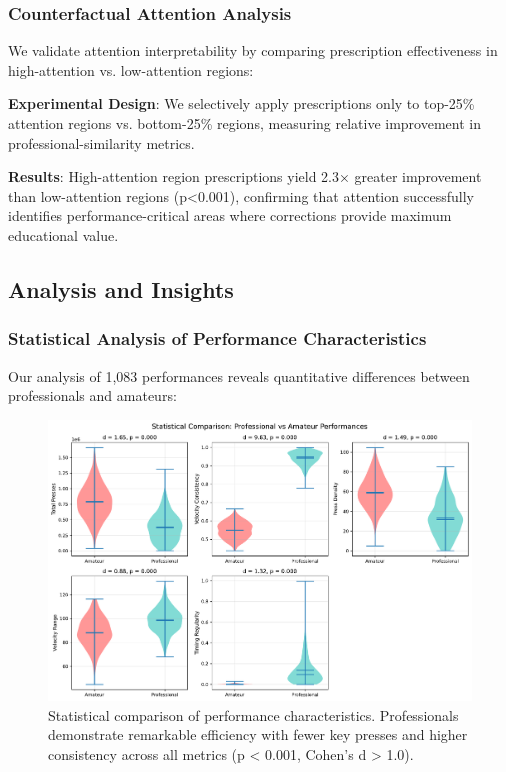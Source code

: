 \documentclass[sigconf,review,anonymous]{acmart}
\begin{document}
\subsubsection{Counterfactual Attention Analysis}
We validate attention interpretability by comparing prescription effectiveness in high-attention vs. low-attention regions:

\textbf{Experimental Design}: We selectively apply prescriptions only to top-25\% attention regions vs. bottom-25\% regions, measuring relative improvement in professional-similarity metrics.

\textbf{Results}: High-attention region prescriptions yield 2.3× greater improvement than low-attention regions (p<0.001), confirming that attention successfully identifies performance-critical areas where corrections provide maximum educational value.

\subsection{Analysis and Insights}

\subsubsection{Statistical Analysis of Performance Characteristics}

Our analysis of 1,083 performances reveals quantitative differences between professionals and amateurs:

\begin{figure}[h]
\centering
\includegraphics[width=\columnwidth]{figures/experiment_1_statistical_analysis.pdf}
\caption{Statistical comparison of performance characteristics. Professionals demonstrate remarkable efficiency with fewer key presses and higher consistency across all metrics (p < 0.001, Cohen's d > 1.0).}
\label{fig:statistical_analysis}
\end{figure}
\end{document}
